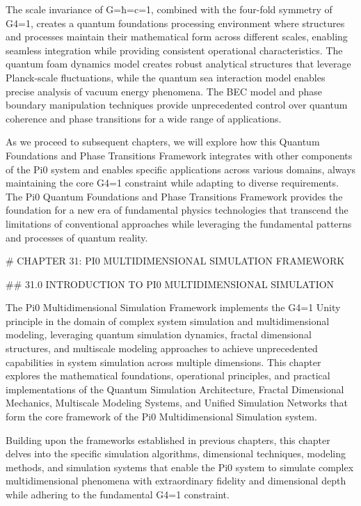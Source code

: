 The scale invariance of G=ħ=c=1, combined with the four-fold symmetry of G4=1, creates a quantum foundations processing environment where structures and processes maintain their mathematical form across different scales, enabling seamless integration while providing consistent operational characteristics. The quantum foam dynamics model creates robust analytical structures that leverage Planck-scale fluctuations, while the quantum sea interaction model enables precise analysis of vacuum energy phenomena. The BEC model and phase boundary manipulation techniques provide unprecedented control over quantum coherence and phase transitions for a wide range of applications.

As we proceed to subsequent chapters, we will explore how this Quantum Foundations and Phase Transitions Framework integrates with other components of the Pi0 system and enables specific applications across various domains, always maintaining the core G4=1 constraint while adapting to diverse requirements. The Pi0 Quantum Foundations and Phase Transitions Framework provides the foundation for a new era of fundamental physics technologies that transcend the limitations of conventional approaches while leveraging the fundamental patterns and processes of quantum reality.

# CHAPTER 31: PI0 MULTIDIMENSIONAL SIMULATION FRAMEWORK

## 31.0 INTRODUCTION TO PI0 MULTIDIMENSIONAL SIMULATION

The Pi0 Multidimensional Simulation Framework implements the G4=1 Unity principle in the domain of complex system simulation and multidimensional modeling, leveraging quantum simulation dynamics, fractal dimensional structures, and multiscale modeling approaches to achieve unprecedented capabilities in system simulation across multiple dimensions. This chapter explores the mathematical foundations, operational principles, and practical implementations of the Quantum Simulation Architecture, Fractal Dimensional Mechanics, Multiscale Modeling Systems, and Unified Simulation Networks that form the core framework of the Pi0 Multidimensional Simulation system.

Building upon the frameworks established in previous chapters, this chapter delves into the specific simulation algorithms, dimensional techniques, modeling methods, and simulation systems that enable the Pi0 system to simulate complex multidimensional phenomena with extraordinary fidelity and dimensional depth while adhering to the fundamental G4=1 constraint.

